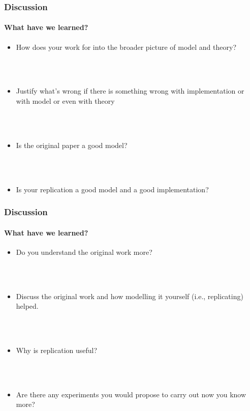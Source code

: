 \documentclass{beamer}
\begin{document}
\begin{frame}
\frametitle{Discussion}
\framesubtitle{What have we learned?}
\begin{itemize}[<+->]

\item How does your work for into the broader picture of model and theory? 

\ \\

\ \\

\item Justify what's wrong if there is something wrong with implementation or with model or even with theory

\ \\

\ \\

 \item Is the original paper a good model?

\ \\

\ \\

\item Is your replication a good model and a good implementation? 


\end{itemize}

\end{frame}
\begin{frame}
\frametitle{Discussion}
\framesubtitle{What have we learned?}
\begin{itemize}[<+->]


\item Do you understand the original work more?

\ \\

\ \\


\item  Discuss the original work and how modelling it yourself (i.e., replicating) helped.

\ \\

\ \\

\item Why is replication useful?

\ \\

\ \\
\item Are there any experiments you would propose to carry out now you know more?
\end{itemize}
\end{frame}
\end{document}
